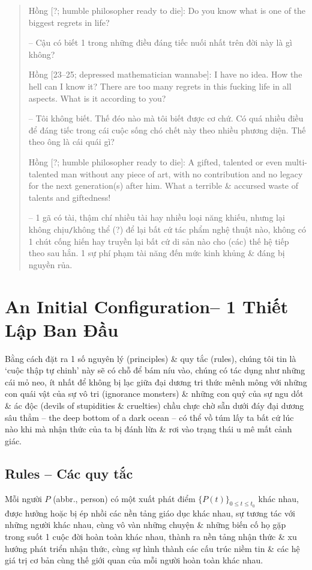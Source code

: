 \documentclass[12pt]{article}
\begin{document}
\begin{quote}
	{\sf Hồng [?; humble philosopher ready to die]}: Do you know what is one of the biggest regrets in life?
	
	-- Cậu có biết 1 trong những điều đáng tiếc nuối nhất trên đời này là gì không?
	
	{\sf Hồng [23--25; depressed mathematician wannabe]}: I have no idea. How the hell can I know it? There are too many regrets in this fucking life in all aspects. What is it according to you?
	
	-- Tôi không biết. Thế đéo nào mà tôi biết được cơ chứ. Có quá nhiều điều để đáng tiếc trong cái cuộc sống chó chết này theo nhiều phương diện. Thế theo ông là cái quái gì?
	
	{\sf Hồng [?; humble philosopher ready to die]}: A gifted, talented or even multi-talented man without any piece of art, with no contribution and no legacy for the next generation(s) after him. What a terrible \& accursed waste of talents and giftedness!
	
	-- 1 gã có tài, thậm chí nhiều tài hay nhiều loại năng khiếu, nhưng lại không chịu{\tt/}không thể (?) để lại bất cứ tác phẩm nghệ thuật nào, không có 1 chút cống hiến hay truyền lại bất cứ di sản nào cho (các) thế hệ tiếp theo sau hắn. 1 sự phí phạm tài năng đến mức kinh khủng \& đáng bị nguyền rủa.
\end{quote}

\section{An Initial Configuration-- 1 Thiết Lập Ban Đầu}
Bằng cách đặt ra 1 số nguyên lý (principles) \& quy tắc (rules), chúng tôi tin là `cuộc thập tự chinh' này sẽ có chỗ để bám níu vào, chúng có tác dụng như những cái mỏ neo, ít nhất để không bị lạc giữa đại dương tri thức mênh mông với những con quái vật của sự vô tri (ignorance monsters) \& những con quỷ của sự ngu dốt \& ác độc (devils of stupidities \& cruelties) chầu chực chờ sẵn dưới đáy đại dương sâu thẳm -- the deep bottom of a dark ocean -- có thể vồ túm lấy ta bất cứ lúc nào khi mà nhận thức của ta bị đánh lừa \& rơi vào trạng thái u mê mất cảnh giác.

\subsection{Rules -- Các quy tắc}
Mỗi người $P$ (abbr., person) có một xuất phát điểm $\{P(t)\}_{0\le t\le t_0}$ khác nhau, được hưởng hoặc bị ép nhồi các nền tảng giáo dục khác nhau, sự tương tác với những người khác nhau, cùng vô vàn những chuyện \& những biến cố họ gặp trong suốt 1 cuộc đời hoàn toàn khác nhau, thành ra nền tảng nhận thức \& xu hướng phát triển nhận thức, cùng sự hình thành các cấu trúc niềm tin \& các hệ giá trị cơ bản cùng thế giới quan của mỗi người hoàn toàn khác nhau.
\end{document}
